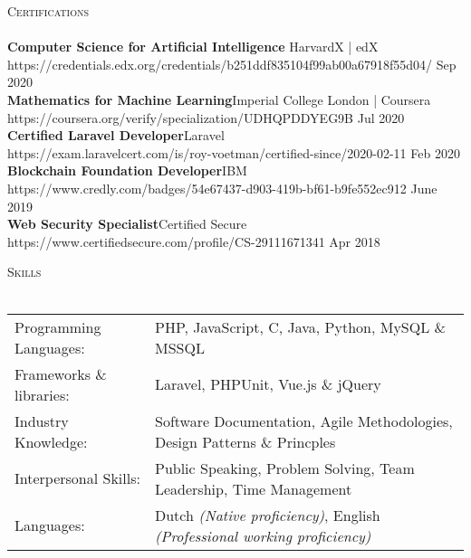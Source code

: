 \documentclass[a4paper]{article}
\newcommand{\lineunder} {
    \vspace*{-8pt} \\
    \hspace*{-18pt} \hrulefill \\
}
\newcommand{\header} [1] {
    {\hspace*{-18pt}\vspace*{6pt} \textsc{#1}}
    \vspace*{-6pt} \lineunder
}
\begin{document}
\newpage

\header{Certifications}
\textbf{Computer Science for Artificial Intelligence }\hfill HarvardX | edX\\
https://credentials.edx.org/credentials/b251ddf835104f99ab00a67918f55d04/ \hfill Sep 2020\\
\vspace{2mm}
\textbf{Mathematics for Machine Learning}\hfill Imperial College London | Coursera\\
https://coursera.org/verify/specialization/UDHQPDDYEG9B \hfill Jul 2020\\
\vspace{2mm}
\textbf{Certified Laravel Developer}\hfill Laravel\\
https://exam.laravelcert.com/is/roy-voetman/certified-since/2020-02-11 \hfill Feb 2020\\
\vspace{2mm}
\textbf{Blockchain Foundation Developer}\hfill IBM\\
https://www.credly.com/badges/54e67437-d903-419b-bf61-b9fe552ec912 \hfill June 2019\\
\vspace{2mm}
\textbf{Web Security Specialist}\hfill Certified Secure\\
https://www.certifiedsecure.com/profile/CS-29111671341 \hfill Apr 2018\\
\vspace{2mm}

\vspace{5mm}

\header{Skills}
\vspace{2mm}
\begin{tabular}{l l}
	Programming Languages:   & PHP, JavaScript, C, Java, Python, MySQL \& MSSQL                     \\
    Frameworks \& libraries: & Laravel, PHPUnit, Vue.js \& jQuery                                   \\
	Industry Knowledge:      & Software Documentation, Agile Methodologies, Design Patterns \& Princples    \\
	Interpersonal Skills:    & Public Speaking, Problem Solving, Team Leadership, Time Management \\
    Languages:               & Dutch \emph{(Native proficiency)}, English \emph{(Professional working proficiency)}\\
\end{tabular}
\vspace{2mm}
\end{document}
